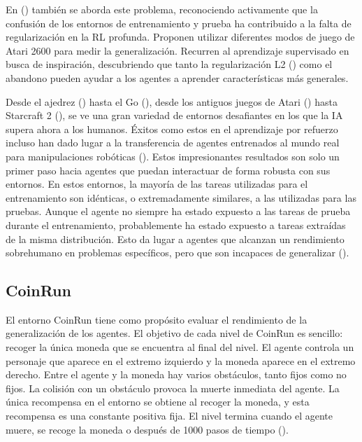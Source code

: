 En (\cite{farebrother2018generalization}) también se aborda este problema, reconociendo activamente que la confusión de los entornos de entrenamiento y prueba ha contribuido a la falta de regularización en la RL profunda. Proponen utilizar diferentes modos de juego de Atari 2600 para medir la generalización. Recurren al aprendizaje supervisado en busca de inspiración, descubriendo que tanto la regularización L2 (\cite{krogh1991simple}) como el abandono pueden ayudar a los agentes a aprender características más generales.

Desde el ajedrez (\cite{silver2017mastering}) hasta el Go (\cite{silver2016mastering}), desde los antiguos juegos de Atari (\cite{bellemare2013arcade}) hasta Starcraft 2 (\cite{vinyals2017starcraft}), se ve una gran variedad de entornos desafiantes en los que la IA supera ahora a los humanos. Éxitos como estos en el aprendizaje por refuerzo incluso han dado lugar a la transferencia de agentes entrenados al mundo real para manipulaciones robóticas (\cite{andrychowicz2020learning}). Estos impresionantes resultados son solo un primer paso hacia agentes que puedan interactuar de forma robusta con sus entornos. En estos entornos, la mayoría de las tareas utilizadas para el entrenamiento son idénticas, o extremadamente similares, a las utilizadas para las pruebas. Aunque el agente no siempre ha estado expuesto a las tareas de prueba durante el entrenamiento, probablemente ha estado expuesto a tareas extraídas de la misma distribución. Esto da lugar a agentes que alcanzan un rendimiento sobrehumano en problemas específicos, pero que son incapaces de generalizar (\cite{packer2018assessing}).

\subsection{CoinRun}

El entorno CoinRun tiene como propósito evaluar el rendimiento de la generalización de los agentes. El objetivo de cada nivel de CoinRun es sencillo: recoger la única moneda que se encuentra al final del nivel. El agente controla un personaje que aparece en el extremo izquierdo y la moneda aparece en el extremo derecho. Entre el agente y la moneda hay varios obstáculos, tanto fijos como no fijos. La colisión con un obstáculo provoca la muerte inmediata del agente. La única recompensa en el entorno se obtiene al recoger la moneda, y esta recompensa es una constante positiva fija. El nivel termina cuando el agente muere, se recoge la moneda o después de 1000 pasos de tiempo (\cite{cobbe2019quantifying}).

